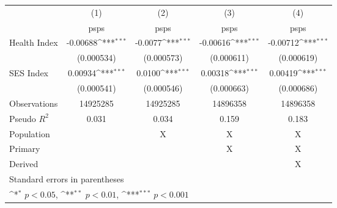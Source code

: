 {
\def\sym#1{\ifmmode^{#1}\else\(^{#1}\)\fi}
\begin{tabular}{l*{4}{c}}
\hline\hline
                    &\multicolumn{1}{c}{(1)}         &\multicolumn{1}{c}{(2)}         &\multicolumn{1}{c}{(3)}         &\multicolumn{1}{c}{(4)}         \\
                    &        psps         &        psps         &        psps         &        psps         \\
\hline
Health Index        &    -0.00688\sym{***}&    -0.0077\sym{***}&    -0.00616\sym{***}         &    -0.00712\sym{***}\\
                    &  (0.000534)         &  (0.000573)         &   (0.000611)         &   (0.000619)         \\
[1em]
SES Index           &     0.00934\sym{***}&     0.0100\sym{***}&    0.00318\sym{***}&    0.00419\sym{***} \\
                    &  (0.000541)         &  (0.000546)         &   (0.000663)         &   (0.000686)         \\
\hline
Observations        &     14925285         &     14925285         &     14896358         &     14896358         \\
Pseudo \(R^{2}\)    &       0.031         &       0.034         &       0.159         &       0.183         \\
Population          &                     &           X         &           X         &           X         \\
Primary             &                     &                     &           X         &           X         \\
Derived             &                     &                     &                     &           X         \\
\hline\hline
\multicolumn{5}{l}{\footnotesize Standard errors in parentheses}\\
\multicolumn{5}{l}{\footnotesize \sym{*} \(p<0.05\), \sym{**} \(p<0.01\), \sym{***} \(p<0.001\)}\\
\end{tabular}
}
